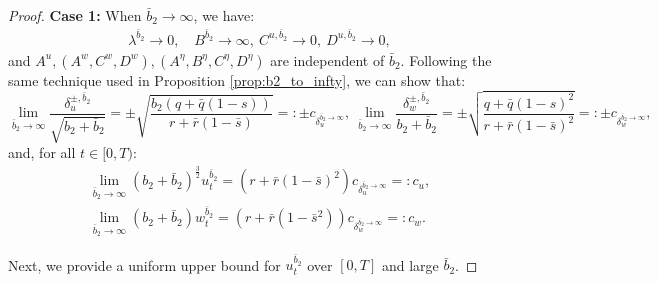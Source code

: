 \documentclass[11pt]{article}
\begin{document}
\begin{proof}
	\textbf{Case 1:} When $\bar{b}_2 \to \infty$,  we have:
	\begin{equation*}
	\begin{array}{l}
	\lambda^{\bar{b}_2} \to 0, \quad B^{\bar{b}_2} \to \infty,\ C^{u,\bar{b}_2} \to 0,\ D^{u,\bar{b}_2} \to 0,
	\end{array}
	\end{equation*}
	and $A^{u}, (A^w,C^w,D^w), (A^\eta, B^\eta, C^\eta, D^\eta)$ are independent of $\bar{b}_2$.
	Following the same technique used in Proposition \ref{prop:b2_to_infty}, we can show that:
	$$ \lim_{\bar{b}_2 \to \infty} \frac{\delta^{\pm,\bar{b}_2}_u}{\sqrt{b_2 + \bar{b}_2}} =\pm \sqrt{ \frac{b_2 (q + \bar{q}(1-s))}{r + \bar{r}(1-\bar{s})} } =: \pm c_{\delta^{\bar{b}_2 \to \infty}_u},
	\
	\lim_{\bar{b}_2 \to \infty} \frac{\delta^{\pm, \bar{b}_2}_w}{b_2 + \bar{b}_2} = \pm \sqrt{\frac{q+\bar{q}(1-s)^2}{r+ \bar{r}(1-\bar{s})^2}} =: \pm c_{\delta_w^{\bar{b}_2 \to \infty}},$$
	and, for all $t \in [0,T)$:
	\begin{equation*}
	\begin{array}{l}
	\lim_{\bar{b}_2 \to \infty}(b_2 + \bar{b}_2)^{\frac{3}{2}} u^{\bar{b}_2}_t = (r + \bar{r}(1-\bar{s})^2) c_{\delta^{\bar{b}_2 \to \infty}_u} =: c_u, \\
	\lim_{\bar{b}_2 \to \infty}(b_2 + \bar{b}_2) w_t^{\bar{b}_2} = (r + \bar{r}(1-\bar{s}^2) ) c_{\delta_w^{\bar{b}_2\to \infty}} =: c_w.
	\end{array}
	\end{equation*}
	
	Next, we provide a uniform upper bound for $u_t^{\bar{b}_2}$ over $[0,T]$ and large $\bar{b}_2$.
	

\end{proof}
\end{document}
